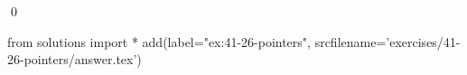 
\begin{ex}
  \label{ex:41-26-pointers}
  
  \qed
\end{ex}
\begin{python0}
from solutions import *
add(label="ex:41-26-pointers",
    srcfilename='exercises/41-26-pointers/answer.tex')
\end{python0}
